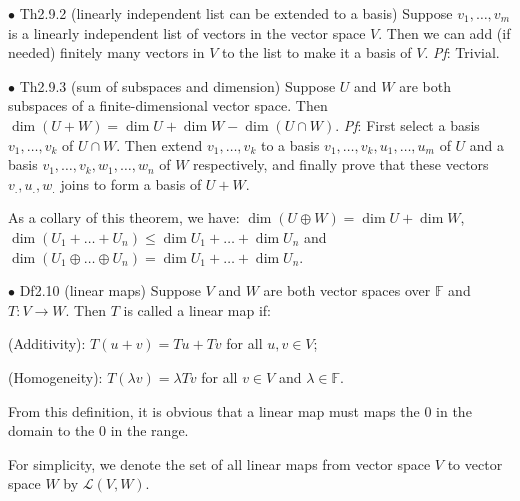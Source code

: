 \documentclass{article}
\begin{document}
\begin{Th}{$\bullet$ Th2.9.2 (linearly independent list can be extended to a basis)}
    Suppose $v_1, \dots, v_m$ is a linearly independent list of vectors in the vector space $V$. Then we can add (if needed) finitely many vectors in $V$ to the list to make it a basis of $V$.
    \tcblower
    \textit{Pf}: Trivial. 
\end{Th}

\begin{Th}{$\bullet$ Th2.9.3 (sum of subspaces and dimension)}
    Suppose $U$ and $W$ are both subspaces of a finite-dimensional vector space. Then $\dim (U+W) = \dim U+\dim W-\dim(U\cap W)$.
    \tcblower
    \textit{Pf}: First select a basis $v_1, \dots, v_k$ of $U\cap W$. Then extend $v_1, \dots, v_k$ to a basis $v_1, \dots, v_k, u_1, \dots, u_m$ of $U$ and a basis $v_1, \dots, v_k, w_1, \dots, w_n$ of $W$ respectively, and finally prove that these vectors $v_., u_., w_.$ joins to form a basis of $U+W$.
\end{Th}

\begin{Rmk}{}
    As a collary of this theorem, we have: \textcolor{Th}{$\dim (U\oplus W) = \dim U+\dim W$, $\dim (U_1+\dots +U_n)\leq \dim U_1 + \dots + \dim U_n$ and $\dim (U_1\oplus\dots\oplus U_n) = \dim U_1 + \dots + \dim U_n$}.
\end{Rmk}

\begin{Df}{$\bullet$ Df2.10 (linear maps)}
    Suppose $V$ and $W$ are both vector spaces over $\mathbb{F}$ and $T: V\rightarrow W$. Then $T$ is called a linear map if:
    \begin{compactenum}
        \item (Additivity): $T(u+v) = Tu+Tv$ for all $u, v\in V$;
        \item (Homogeneity): $T(\lambda v) = \lambda Tv$ for all $v\in V$ and $\lambda\in\mathbb{F}$.
    \end{compactenum}
\end{Df}

\begin{Rmk}{}
    \begin{compactenum}
        \item From this definition, \textcolor{Th}{it is obvious that a linear map must maps the $0$ in the domain to the $0$ in the range.}
        \item For simplicity, \textcolor{Df}{we denote the set of all linear maps from vector space $V$ to vector space $W$ by $\mathcal{L}(V, W)$.}
    \end{compactenum}
\end{Rmk}
\end{document}
